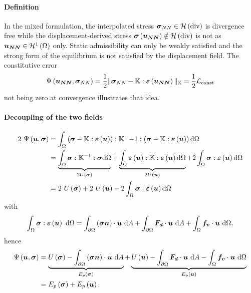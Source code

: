 \paragraph{Definition}
In the mixed formulation, the interpolated stress $\sigm_{NN} \in \mathcal{H}\left(\text{div}\right)$ is divergence free while the displacement-derived stress $\sigm\left(\vect{u_{NN}}\right) \notin \mathcal{H}\left(\text{div}\right)$ is not as $\vect{u_{NN}}\in \mathcal{H}^1\left(\Omega\right)$ only. Static admissibility can only be weakly satisfied and the strong form of the equilibrium is not satisfied by the displacement field. The constitutive error
\begin{equation}
	\Psi\left(\vect{u_{NN}},\sigm_{NN}\right) = \frac{1}{2} \Vert \sigm_{NN} - \ftensor{K}:\eps\left(\vect{u_{NN}}\right) \Vert_{\ftensor{K}} = \frac{1}{2} \mathcal{L}_{\text{const}}
	\label{eq:EC}
\end{equation}
not being zero at convergence illustrates that idea.

\paragraph{Decoupling of the two fields}

\begin{equation}
	\begin{split}
			2~\Psi\left(\vect{u},\sigm\right) & =  \intV \left(\sigm - \ftensor{K}:\eps\left(\vect{u}\right)\right) : \ftensor{K}^-{-1}:\left(\sigm - \ftensor{K}:\eps\left(\vect{u}\right)\right) \dV\\ 
			& = \underbrace{\intV \sigm: \ftensor{K}^{-1}: \sigm \dV}_{2U\left(\sigm\right)} + \underbrace{\intV \eps\left(\vect{u}\right):\ftensor{K}:\eps\left(\vect{u}\right) \dV}_{2U\left(\vect{u}\right)}+ 2\intV\sigm:\eps\left(\vect{u}\right)\dV\\
			& = 2~ U\left(\sigm\right) +2~ U\left(\vect{u}\right) - 2\intV\sigm:\eps\left(\vect{u}\right)\dV\\
	\end{split}
\end{equation}
with 
\begin{equation}
	\intV\sigm:\eps\left(\vect{u}\right)~\dV = \intS \left(\sigm\vect{n}\right) \cdot \vect{u}~\dS +  \intS \vect{F_d}\cdot \vect{u} ~\dS +\intV \vect{f_v}\cdot\vect{u}~\dV,
\end{equation}
hence
\begin{equation}
		\begin{split}
			\Psi\left(\vect{u},\sigm\right)  & = \underbrace{U\left(\sigm\right) - \intS \left(\sigm\vect{n}\right) \cdot \vect{u}~\dS }_{E_p\left(\sigm\right)} +\underbrace{U\left(\vect{u}\right) -  \intS \vect{F_d}\cdot \vect{u} ~\dS -\intV \vect{f_v}\cdot\vect{u}~\dV}_{E_p\left(\vect{u}\right)}\\
			& =E_p\left(\sigm\right)+E_p\left(\vect{u}\right).
		\end{split}
\end{equation}

